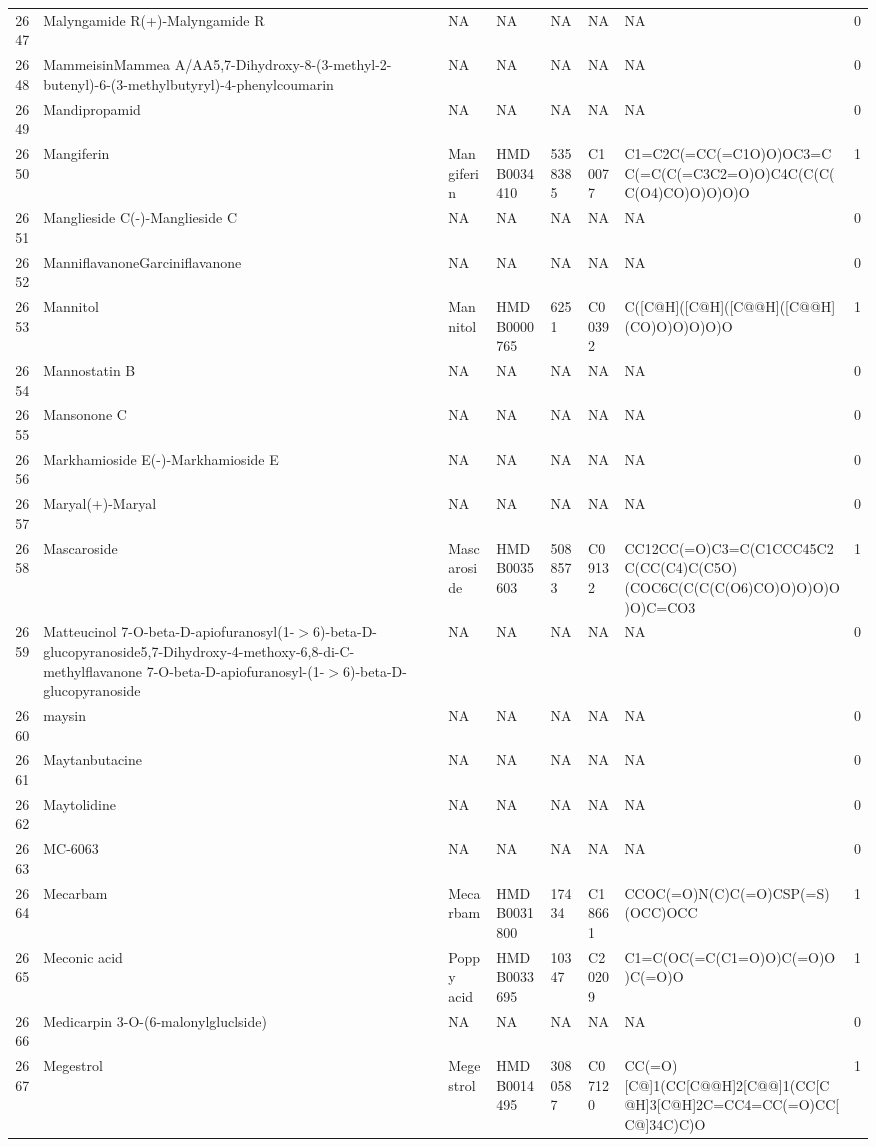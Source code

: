 \documentclass[a4paper]{article}
\begin{document}
\begin{longtable}{rlllllll}
  2647 & Malyngamide R(+)-Malyngamide R & NA & NA & NA & NA & NA & 0 \\ 
  2648 & MammeisinMammea A/AA5,7-Dihydroxy-8-(3-methyl-2-butenyl)-6-(3-methylbutyryl)-4-phenylcoumarin & NA & NA & NA & NA & NA & 0 \\ 
  2649 & Mandipropamid & NA & NA & NA & NA & NA & 0 \\ 
  2650 & Mangiferin & Mangiferin & HMDB0034410 & 5358385 & C10077 & C1=C2C(=CC(=C1O)O)OC3=CC(=C(C(=C3C2=O)O)C4C(C(C(C(O4)CO)O)O)O)O & 1 \\ 
  2651 & Manglieside C(-)-Manglieside C & NA & NA & NA & NA & NA & 0 \\ 
  2652 & ManniflavanoneGarciniflavanone & NA & NA & NA & NA & NA & 0 \\ 
  2653 & Mannitol & Mannitol & HMDB0000765 & 6251 & C00392 & C([C@H]([C@H]([C@@H]([C@@H](CO)O)O)O)O)O & 1 \\ 
  2654 & Mannostatin B & NA & NA & NA & NA & NA & 0 \\ 
  2655 & Mansonone C & NA & NA & NA & NA & NA & 0 \\ 
  2656 & Markhamioside E(-)-Markhamioside E & NA & NA & NA & NA & NA & 0 \\ 
  2657 & Maryal(+)-Maryal & NA & NA & NA & NA & NA & 0 \\ 
  2658 & Mascaroside & Mascaroside & HMDB0035603 & 5088573 & C09132 & CC12CC(=O)C3=C(C1CCC45C2C(CC(C4)C(C5O)(COC6C(C(C(C(O6)CO)O)O)O)O)O)C=CO3 & 1 \\ 
  2659 & Matteucinol 7-O-beta-D-apiofuranosyl(1-$>$6)-beta-D-glucopyranoside5,7-Dihydroxy-4-methoxy-6,8-di-C-methylflavanone 7-O-beta-D-apiofuranosyl-(1-$>$6)-beta-D-glucopyranoside & NA & NA & NA & NA & NA & 0 \\ 
  2660 & maysin & NA & NA & NA & NA & NA & 0 \\ 
  2661 & Maytanbutacine & NA & NA & NA & NA & NA & 0 \\ 
  2662 & Maytolidine & NA & NA & NA & NA & NA & 0 \\ 
  2663 & MC-6063 & NA & NA & NA & NA & NA & 0 \\ 
  2664 & Mecarbam & Mecarbam & HMDB0031800 & 17434 & C18661 & CCOC(=O)N(C)C(=O)CSP(=S)(OCC)OCC & 1 \\ 
  2665 & Meconic acid & Poppy acid & HMDB0033695 & 10347 & C20209 & C1=C(OC(=C(C1=O)O)C(=O)O)C(=O)O & 1 \\ 
  2666 & Medicarpin 3-O-(6-malonylgluclside) & NA & NA & NA & NA & NA & 0 \\ 
  2667 & Megestrol & Megestrol & HMDB0014495 & 3080587 & C07120 & CC(=O)[C@]1(CC[C@@H]2[C@@]1(CC[C@H]3[C@H]2C=CC4=CC(=O)CC[C@]34C)C)O & 1 \\ 

\end{longtable}
\end{document}
